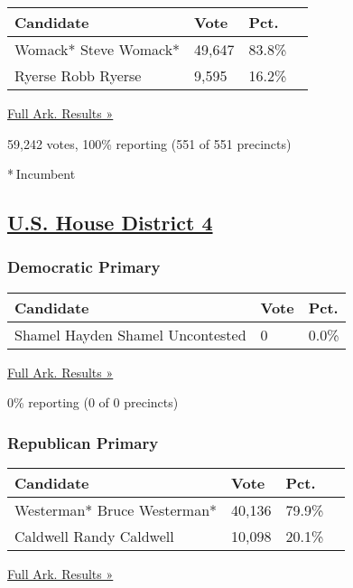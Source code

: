 \begin{longtable}[]{@{}llll@{}}
\toprule
Candidate & Vote & Pct. &\tabularnewline
\midrule
\endhead
 Womack* Steve Womack* & 49,647 & 83.8\% &\tabularnewline
 Ryerse Robb Ryerse & 9,595 & 16.2\% &\tabularnewline
\bottomrule
\end{longtable}

\href{https://www.nytimes3xbfgragh.onion/elections/results/arkansas}{Full
Ark. Results »}

59,242 votes, 100\% reporting (551 of 551 precincts)

* Incumbent

\hypertarget{us-house-district-4}{%
\subsection{\texorpdfstring{\href{https://www.nytimes3xbfgragh.onion/elections/results/arkansas-house-district-4-primary-election}{U.S.
House District 4}}{U.S. House District 4}}\label{us-house-district-4}}

\hypertarget{democratic-primary-4}{%
\subsubsection{Democratic Primary}\label{democratic-primary-4}}

\begin{longtable}[]{@{}lll@{}}
\toprule
Candidate & Vote & Pct.\tabularnewline
\midrule
\endhead
 Shamel Hayden Shamel Uncontested & 0 & 0.0\%\tabularnewline
\bottomrule
\end{longtable}

\href{https://www.nytimes3xbfgragh.onion/elections/results/arkansas}{Full
Ark. Results »}

0\% reporting (0 of 0 precincts)

\hypertarget{republican-primary-4}{%
\subsubsection{Republican Primary}\label{republican-primary-4}}

\begin{longtable}[]{@{}llll@{}}
\toprule
Candidate & Vote & Pct. &\tabularnewline
\midrule
\endhead
 Westerman* Bruce Westerman* & 40,136 & 79.9\% &\tabularnewline
 Caldwell Randy Caldwell & 10,098 & 20.1\% &\tabularnewline
\bottomrule
\end{longtable}

\href{https://www.nytimes3xbfgragh.onion/elections/results/arkansas}{Full
Ark. Results »}

